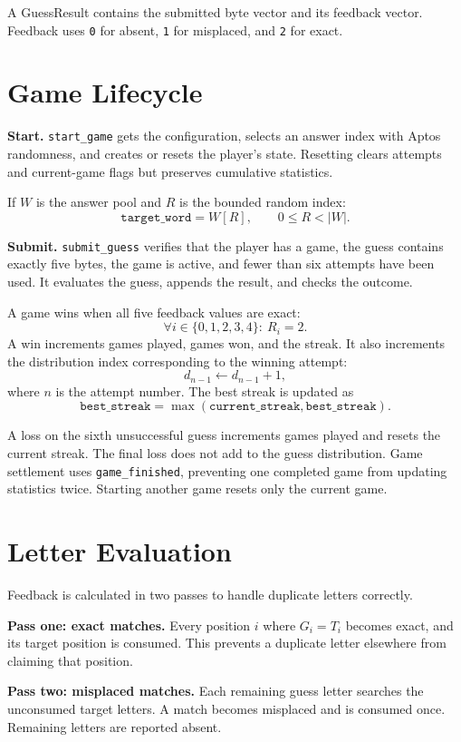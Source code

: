 \documentclass[10pt]{article}
\begin{document}
A GuessResult contains the submitted byte vector and its feedback vector. Feedback uses \texttt{0} for absent, \texttt{1} for misplaced, and \texttt{2} for exact.

\section{Game Lifecycle}

\textbf{Start.} \texttt{start\_game} gets the configuration, selects an answer index with Aptos randomness, and creates or resets the player's state. Resetting clears attempts and current-game flags but preserves cumulative statistics.

If $W$ is the answer pool and $R$ is the bounded random index:
\[
\texttt{target\_word}=W[R], \qquad 0\leq R < |W|.
\]

\textbf{Submit.} \texttt{submit\_guess} verifies that the player has a game, the guess contains exactly five bytes, the game is active, and fewer than six attempts have been used. It evaluates the guess, appends the result, and checks the outcome.

A game wins when all five feedback values are exact:
\[
\forall i\in\{0,1,2,3,4\}:\ R_i=2.
\]
A win increments games played, games won, and the streak. It also increments the distribution index corresponding to the winning attempt:
\[
d_{n-1}\leftarrow d_{n-1}+1,
\]
where $n$ is the attempt number. The best streak is updated as
\[
\texttt{best\_streak}=\max(\texttt{current\_streak},\texttt{best\_streak}).
\]

A loss on the sixth unsuccessful guess increments games played and resets the current streak. The final loss does not add to the guess distribution. Game settlement uses \texttt{game\_finished}, preventing one completed game from updating statistics twice. Starting another game resets only the current game.

\section{Letter Evaluation}

Feedback is calculated in two passes to handle duplicate letters correctly.

\textbf{Pass one: exact matches.} Every position $i$ where $G_i=T_i$ becomes exact, and its target position is consumed. This prevents a duplicate letter elsewhere from claiming that position.

\textbf{Pass two: misplaced matches.} Each remaining guess letter searches the unconsumed target letters. A match becomes misplaced and is consumed once. Remaining letters are reported absent.
\end{document}

